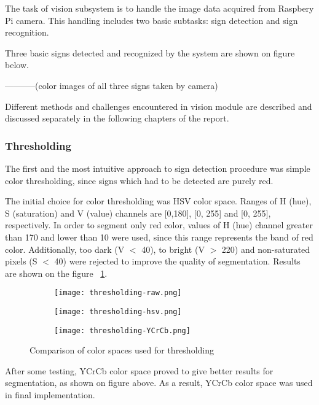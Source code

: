 
The task of vision subsystem is to handle the image data acquired from Raspbery Pi camera. This handling includes two basic subtasks: sign detection and sign recognition.

Three basic signs detected and recognized by the system are shown on figure below.

-----------(color images of all three signs taken by camera)

Different methods and challenges encountered in vision module are described and discussed separately in the following chapters of the report.

\subsubsection{Thresholding}

The first and the most intuitive approach to sign detection procedure was simple color thresholding, since signs which had to be detected are purely red.

The initial choice for color thresholding was HSV color space. Ranges of H (hue), S (saturation) and V (value) channels are [0,180], [0, 255] and [0, 255], respectively. In order to segment only red color, values of H (hue) channel greater than 170 and lower than 10 were used, since this range represents the band of red color. Additionally, too dark (V $ < $ 40), to bright (V $ > $ 220) and non-saturated pixels (S $ < $ 40) were rejected to improve the quality of segmentation. Results are shown on the figure ~\ref{fig:color-spaces}.

\begin{figure}[th!]
	\centering
	\begin{subfigure}[b]{0.3\textwidth}
		\centering
	\texttt{[image: thresholding-raw.png]}
	\end{subfigure}
	\begin{subfigure}[b]{0.3\textwidth}
		\centering
		\texttt{[image: thresholding-hsv.png]}
	\end{subfigure}
	\begin{subfigure}[b]{0.3\textwidth}
		\centering
		\texttt{[image: thresholding-YCrCb.png]}
	\end{subfigure}
	\caption{Comparison of color spaces used for thresholding}
	\label{fig:color-spaces}
\end{figure}

After some testing, YCrCb color space proved to give better results for segmentation, as shown on figure above. As a result, YCrCb color space was used in final implementation.


